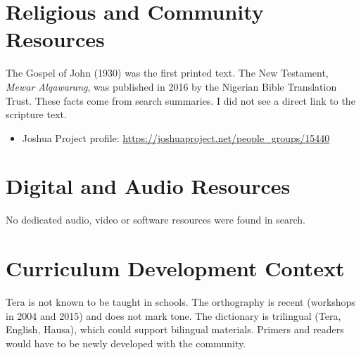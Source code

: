 \documentclass[12pt]{article}
\begin{document}
\section{Religious and Community Resources}
The Gospel of John (1930) was the first printed text. The New Testament, \emph{Mewar Alqawarang}, was published in 2016 by the Nigerian Bible Translation Trust. These facts come from search summaries. I did not see a direct link to the scripture text.
\begin{itemize}
\item Joshua Project profile: \url{https://joshuaproject.net/people_groups/15440}
\end{itemize}
\section{Digital and Audio Resources}
No dedicated audio, video or software resources were found in search.
\section{Curriculum Development Context}
Tera is not known to be taught in schools. The orthography is recent (workshops in 2004 and 2015) and does not mark tone. The dictionary is trilingual (Tera, English, Hausa), which could support bilingual materials. Primers and readers would have to be newly developed with the community.
\end{document}
